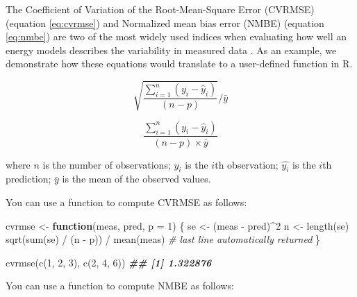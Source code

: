 \documentclass[
]{book}
\newenvironment{Shaded}{\begin{snugshade}}{\end{snugshade}}
\newcommand{\AttributeTok}[1]{\textcolor[rgb]{0.77,0.63,0.00}{#1}}
\newcommand{\CommentTok}[1]{\textcolor[rgb]{0.56,0.35,0.01}{\textit{#1}}}
\newcommand{\ControlFlowTok}[1]{\textcolor[rgb]{0.13,0.29,0.53}{\textbf{#1}}}
\newcommand{\DecValTok}[1]{\textcolor[rgb]{0.00,0.00,0.81}{#1}}
\newcommand{\DocumentationTok}[1]{\textcolor[rgb]{0.56,0.35,0.01}{\textbf{\textit{#1}}}}
\newcommand{\FunctionTok}[1]{\textcolor[rgb]{0.00,0.00,0.00}{#1}}
\newcommand{\NormalTok}[1]{#1}
\newcommand{\OtherTok}[1]{\textcolor[rgb]{0.56,0.35,0.01}{#1}}
\newcommand{\SpecialCharTok}[1]{\textcolor[rgb]{0.00,0.00,0.00}{#1}}
\begin{document}
The Coefficient of Variation of the Root-Mean-Square Error (CVRMSE) (equation \eqref{eq:cvrmse}) and Normalized mean bias error (NMBE) (equation \eqref{eq:nmbe}) are two of the most widely used indices when evaluating how well an energy models describes the variability in measured data \citep{ashrae_ashrae_2014}. As an example, we demonstrate how these equations would translate to a user-defined function in R.

\begin{equation} 
  \sqrt{\frac{\sum_{i=1}^{n} \left(y_i - \hat{y}_i\right)}{(n-p)}} \Big/ \bar{y}
  \label{eq:cvrmse}
\end{equation}

\begin{equation} 
  \frac{\sum_{i=1}^{n} \left(y_i - \hat{y}_i\right)}{(n-p)\times\bar{y}}
  \label{eq:nmbe}
\end{equation}

where \(n\) is the number of observations; \(y_i\) is the \(i\)th observation; \(\hat{y_i}\) is the \(i\)th prediction; \(\bar{y}\) is the mean of the observed values.

You can use a function to compute CVRMSE as follows:

\begin{Shaded}
\begin{Highlighting}[]
\NormalTok{cvrmse }\OtherTok{\textless{}{-}} \ControlFlowTok{function}\NormalTok{(meas, pred, }\AttributeTok{p =} \DecValTok{1}\NormalTok{) \{}
\NormalTok{  se }\OtherTok{\textless{}{-}}\NormalTok{ (meas }\SpecialCharTok{{-}}\NormalTok{ pred)}\SpecialCharTok{\^{}}\DecValTok{2}
\NormalTok{  n }\OtherTok{\textless{}{-}} \FunctionTok{length}\NormalTok{(se)}
  \FunctionTok{sqrt}\NormalTok{(}\FunctionTok{sum}\NormalTok{(se) }\SpecialCharTok{/}\NormalTok{ (n }\SpecialCharTok{{-}}\NormalTok{ p)) }\SpecialCharTok{/} \FunctionTok{mean}\NormalTok{(meas) }\CommentTok{\# last line automatically returned}
\NormalTok{\}}

\FunctionTok{cvrmse}\NormalTok{(}\FunctionTok{c}\NormalTok{(}\DecValTok{1}\NormalTok{, }\DecValTok{2}\NormalTok{, }\DecValTok{3}\NormalTok{), }\FunctionTok{c}\NormalTok{(}\DecValTok{2}\NormalTok{, }\DecValTok{4}\NormalTok{, }\DecValTok{6}\NormalTok{))}
\DocumentationTok{\#\# [1] 1.322876}
\end{Highlighting}
\end{Shaded}

You can use a function to compute NMBE as follows:
\end{document}
